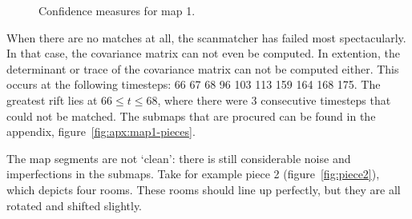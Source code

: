 \begin{figure}[ht]
  \centering
  \caption{Confidence measures for map 1.}
  \label{fig:map1-confidence-measures}
\end{figure}

When there are no matches at all, the scanmatcher has failed most spectacularly. In that case, the covariance matrix can not even be computed. In extention, the determinant or trace of the covariance matrix can not be computed either. This occurs at the following timesteps: 66  67  68  96 103 113 159 164 168 175. The greatest rift lies at $66 \le t \le68$, where there were 3 consecutive timesteps that could not be matched. The submaps that are procured can be found in the appendix, figure~\ref{fig:apx:map1-pieces}. 

The map segments are not `clean': there is still considerable noise and imperfections in the submaps. Take for example piece 2 (figure~\ref{fig:piece2}), which depicts four rooms. These rooms should line up perfectly, but they are all rotated and shifted slightly. 

